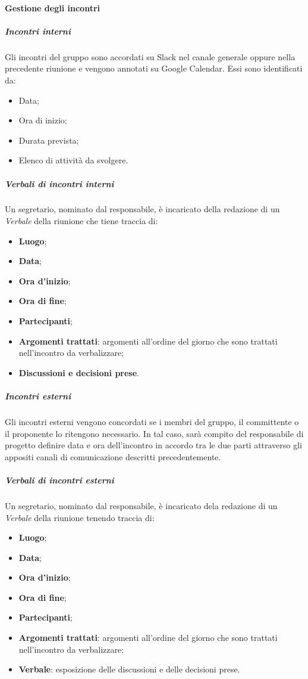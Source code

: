 			\paragraph{Gestione degli incontri}
				\subparagraph*{Incontri interni}
					Gli incontri del gruppo sono accordati su Slack nel canale generale oppure nella precedente riunione e vengono annotati su Google Calendar. Essi sono identificati da:
					\begin{itemize}
						\item Data;
						\item Ora di inizio;
						\item Durata prevista;
						\item Elenco di attività da svolgere.
					\end{itemize}
				\subparagraph*{Verbali di incontri interni}
					Un segretario, nominato dal responsabile, è incaricato della redazione di un \textit{Verbale} della riunione che tiene traccia di:
					\begin{itemize}
						\item \textbf{Luogo};
						\item \textbf{Data};
						\item \textbf{Ora d'inizio};
						\item \textbf{Ora di fine};
						\item \textbf{Partecipanti};
						\item \textbf{Argomenti trattati}: argomenti all'ordine del giorno che sono trattati nell'incontro da verbalizzare;
						\item \textbf{Discussioni e decisioni prese}.
					\end{itemize}
				\subparagraph*{Incontri esterni}
					Gli incontri esterni vengono concordati se i membri del gruppo, il committente o il proponente lo ritengono necessario. In tal caso, sarà compito del responsabile di progetto definire data e ora dell'incontro in accordo tra le due parti attraverso gli appositi canali di comunicazione descritti precedentemente.
				\subparagraph*{Verbali di incontri esterni}
					Un segretario, nominato dal responsabile, è incaricato dela redazione di un \textit{Verbale} della riunione tenendo traccia di:
					\begin{itemize}
						\item \textbf{Luogo};
						\item \textbf{Data};
						\item \textbf{Ora d'inizio};
						\item \textbf{Ora di fine};
						\item \textbf{Partecipanti};
						\item \textbf{Argomenti trattati}: argomenti all'ordine del giorno che sono trattati nell'incontro da verbalizzare;
						\item \textbf{Verbale}: esposizione delle discussioni e delle decisioni prese.
					\end{itemize}
